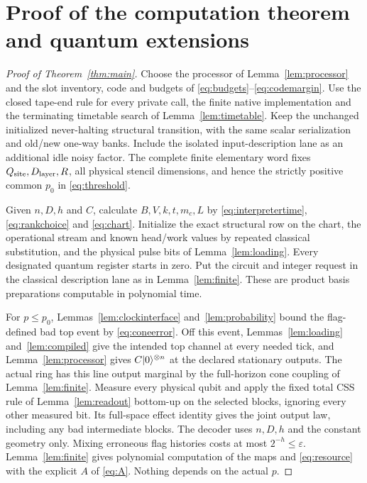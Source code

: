\section{Proof of the computation theorem and quantum extensions}\label{sec:proofs}
\begin{proof}[Proof of Theorem~\ref{thm:main}]
Choose the processor of Lemma~\ref{lem:processor} and the slot inventory, code and budgets of \eqref{eq:budgets}--\eqref{eq:codemargin}. Use the closed tape-end rule for every private call, the finite native implementation and the terminating timetable search of Lemma~\ref{lem:timetable}. Keep the unchanged initialized never-halting structural transition, with the same scalar serialization and old/new one-way banks. Include the isolated input-description lane as an additional idle noisy factor. The complete finite elementary word fixes $Q_{\rm site},D_{\rm layer},R$, all physical stencil dimensions, and hence the strictly positive common $p_0$ in \eqref{eq:threshold}.

Given $n,D,h$ and $C$, calculate $B,V,k,t,m_c,L$ by \eqref{eq:interpretertime}, \eqref{eq:rankchoice} and \eqref{eq:chart}. Initialize the exact structural row on the chart, the operational stream and known head/work values by repeated classical substitution, and the physical pulse bits of Lemma~\ref{lem:loading}. Every designated quantum register starts in zero. Put the circuit and integer request in the classical description lane as in Lemma~\ref{lem:finite}. These are product basis preparations computable in polynomial time.

For $p\le p_0$, Lemmas~\ref{lem:clockinterface} and~\ref{lem:probability} bound the flag-defined bad top event by \eqref{eq:coneerror}. Off this event, Lemmas~\ref{lem:loading} and~\ref{lem:compiled} give the intended top channel at every needed tick, and Lemma~\ref{lem:processor} gives $C\lvert 0\rangle^{\otimes n}$ at the declared stationary outputs. The actual ring has this line output marginal by the full-horizon cone coupling of Lemma~\ref{lem:finite}. Measure every physical qubit and apply the fixed total CSS rule of Lemma~\ref{lem:readout} bottom-up on the selected blocks, ignoring every other measured bit. Its full-space effect identity gives the joint output law, including any bad intermediate blocks. The decoder uses $n,D,h$ and the constant geometry only. Mixing erroneous flag histories costs at most $2^{-h}\le\varepsilon$. Lemma~\ref{lem:finite} gives polynomial computation of the maps and \eqref{eq:resource} with the explicit $A$ of \eqref{eq:A}. Nothing depends on the actual $p$.
\end{proof}

